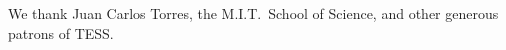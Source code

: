 \documentclass{emulateapj}
\begin{document}



% 
% 
% 

\acknowledgments
We thank Juan Carlos Torres, the M.I.T.\ School of Science, and other
generous patrons of TESS.

\eject
\clearpage
\end{document}
